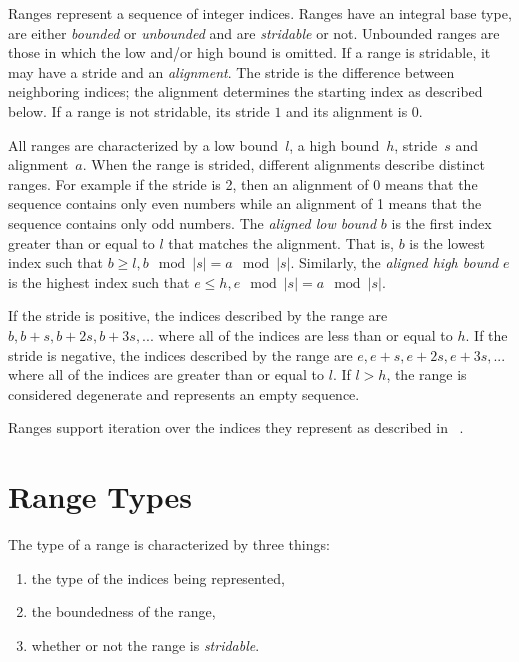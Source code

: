 \label{Ranges}

Ranges represent a sequence of integer indices.  Ranges have an integral base
type, are either \emph{bounded} or \emph{unbounded} and are \emph{stridable} or not.
Unbounded ranges are those in which the low and/or high bound is
omitted.  
If a range is stridable, it may have a stride and an
\emph{alignment}.  The stride is the difference between neighboring indices; the
alignment determines the starting index as described below.  If a range is not
stridable, its stride $1$ and its alignment is $0$.

All ranges are characterized by a low bound~$l$, a high bound~$h$, stride~$s$
and alignment~$a$.  When the range is strided, different alignments describe
distinct ranges.  For example if the stride is 2, then an alignment of 0 means
that the sequence contains only even numbers while an alignment of 1 means that the
sequence contains only odd numbers.  The \emph{aligned low bound} $b$ is the first
index greater than or equal to $l$ that matches the alignment.  That
is, $b$ is the lowest index such that $b \geq l, b\!\mod |s| = a\!\mod |s|$.  Similarly,
the \emph{aligned high bound} $e$ is the highest index such that $e \leq h, e\!\mod |s| =
a\!\mod |s|$.

If the stride is positive, the indices
described by the range are $b, b+s, b+2s, b+3s, ...$ where all of the
indices are less than or equal to $h$.  If the stride is negative, the indices
described by the range are $e, e+s, e+2s, e+3s, ...$ where all of the
indices are greater than or equal to $l$.  
If $l > h$, the range is considered
degenerate and represents an empty sequence. 

Ranges support iteration over the
indices they represent as described in ~.


\section{Range Types}
\label{Range_Types}

The type of a range is characterized by three things:
\begin{enumerate}
\item the type of the indices being represented, 
\item the boundedness of the range,
\item whether or not the range is \emph{stridable}.
\end{enumerate}

